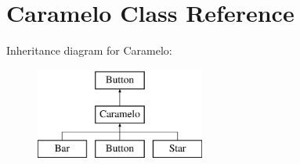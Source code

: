 \hypertarget{classCaramelo}{\section{Caramelo Class Reference}
\label{classCaramelo}
}
Inheritance diagram for Caramelo\-:\begin{figure}[H]
\begin{center}
\leavevmode
\includegraphics[height=3.000000cm]{classCaramelo}
\end{center}
\end{figure}

